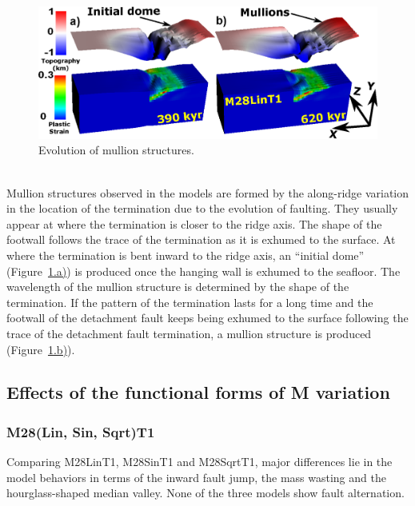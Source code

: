 \begin{figure}[h]
  \centering
    \includegraphics[width=1.0\textwidth]{./Figures/fig_Results_3_2_6_mullion_evolution.eps}
  \caption{Evolution of mullion structures.}
 \label{fig_Results_3_2_6_mullion_evolution}
\end{figure}
~\\
Mullion structures observed in the models are formed by the along-ridge variation in the location of the termination due to the evolution of faulting. They usually appear at where the termination is closer to the ridge axis. The shape of the footwall follows the trace of the termination as it is exhumed to the surface. At where the termination is bent inward to the ridge axis, an ``initial dome'' (Figure~\hyperref[fig_Results_3_2_6_mullion_evolution]{\ref{fig_Results_3_2_6_mullion_evolution}.a)}) is produced once the hanging wall is exhumed to the seafloor. The wavelength of the mullion structure is determined by the shape of the termination. If the pattern of the termination lasts for a long time and the footwall of the detachment fault keeps being exhumed to the surface following the trace of the detachment fault termination, a mullion structure is produced (Figure~\hyperref[fig_Results_3_2_6_mullion_evolution]{\ref{fig_Results_3_2_6_mullion_evolution}.b)}). 


\subsection{Effects of the functional forms of M variation}

\subsubsection{M28(Lin, Sin, Sqrt)T1}

Comparing M28LinT1, M28SinT1 and M28SqrtT1, major differences lie in the model behaviors in terms of the inward fault jump, the mass wasting and the hourglass-shaped median valley. None of the three models show fault alternation.    

